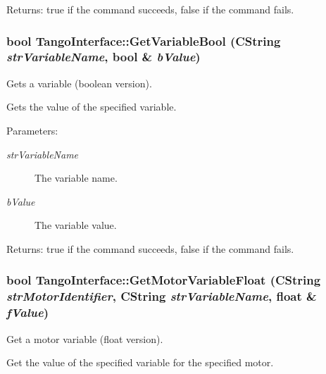 \begin{Desc}
\item[Returns:]true if the command succeeds, false if the command fails. \end{Desc}
\hypertarget{classTangoInterface_92743acefced68c408d846813dba4697}{
\subsubsection[GetVariableBool]{\setlength{\rightskip}{0pt plus 5cm}bool TangoInterface::GetVariableBool (CString {\em strVariableName}, \/  bool \& {\em bValue})}}
\label{classTangoInterface_92743acefced68c408d846813dba4697}


Gets a variable (boolean version). 

Gets the value of the specified variable.

\begin{Desc}
\item[Parameters:]
\begin{description}
\item[{\em strVariableName}]The variable name. \item[{\em bValue}]The variable value. \end{description}
\end{Desc}


\begin{Desc}
\item[Returns:]true if the command succeeds, false if the command fails. \end{Desc}
\hypertarget{classTangoInterface_c2f7cbbe72be043cbadf73a8bf23654d}{
\subsubsection[GetMotorVariableFloat]{\setlength{\rightskip}{0pt plus 5cm}bool TangoInterface::GetMotorVariableFloat (CString {\em strMotorIdentifier}, \/  CString {\em strVariableName}, \/  float \& {\em fValue})}}
\label{classTangoInterface_c2f7cbbe72be043cbadf73a8bf23654d}


Get a motor variable (float version). 

Get the value of the specified variable for the specified motor.

